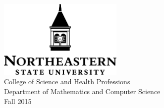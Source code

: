 \documentclass{article}
\begin{document}
\begin{center}
\includegraphics[width=6cm]{prfs/tex/gfx/nsulogo} \\ \vspace{0.5cm}
College of Science and Health Professions \\
Department of Mathematics and Computer Science \\
Fall 2015
\end{center}
\end{document}
